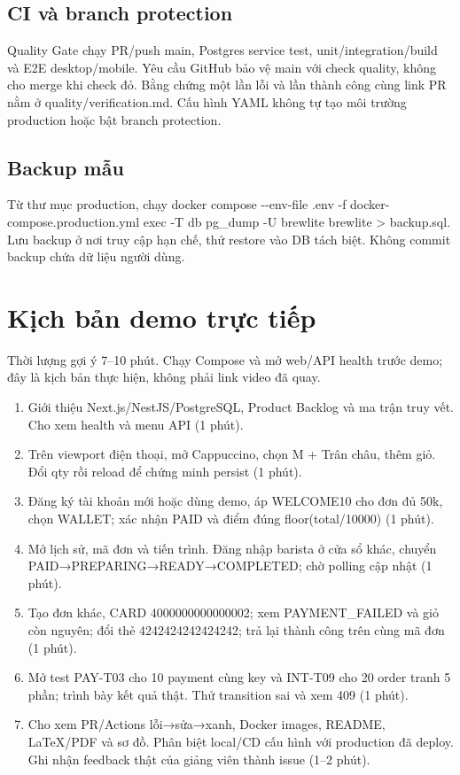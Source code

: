 \documentclass[a4paper,12pt,oneside]{report}
\begin{document}
\subsection{CI và branch protection}
Quality Gate chạy PR/\allowbreak{}push main, Postgres service test, unit/\allowbreak{}integration/\allowbreak{}build và E2E desktop/\allowbreak{}mobile. Yêu cầu GitHub bảo vệ main với check {\small\ttfamily quality}, không cho merge khi check đỏ. Bằng chứng một lần lỗi và lần thành công cùng link PR nằm ở quality/\allowbreak{}verification.md. Cấu hình YAML không tự tạo môi trường production hoặc bật branch protection.


\subsection{Backup mẫu}
Từ thư mục production, chạy {\small\ttfamily docker compose -\allowbreak{}-\allowbreak{}env-\allowbreak{}file .\allowbreak{}env -\allowbreak{}f docker-\allowbreak{}compose.\allowbreak{}production.\allowbreak{}yml exec -\allowbreak{}T db pg\_\allowbreak{}dump -\allowbreak{}U brewlite brewlite > backup.\allowbreak{}sql}. Lưu backup ở nơi truy cập hạn chế, thử restore vào DB tách biệt. Không commit backup chứa dữ liệu người dùng.


\section{Kịch bản demo trực tiếp}

Thời lượng gợi ý 7–10 phút. Chạy Compose và mở web/\allowbreak{}API health trước demo; đây là kịch bản thực hiện, không phải link video đã quay.


\begin{enumerate}
\item Giới thiệu Next.js/\allowbreak{}NestJS/\allowbreak{}PostgreSQL, Product Backlog và ma trận truy vết. Cho xem health và menu API (1 phút).
\item Trên viewport điện thoại, mở Cappuccino, chọn M + Trân châu, thêm giỏ. Đổi qty rồi reload để chứng minh persist (1 phút).
\item Đăng ký tài khoản mới hoặc dùng demo, áp WELCOME10 cho đơn đủ 50k, chọn WALLET; xác nhận PAID và điểm đúng floor(total/\allowbreak{}10000) (1 phút).
\item Mở lịch sử, mã đơn và tiến trình. Đăng nhập barista ở cửa sổ khác, chuyển PAID→PREPARING→READY→COMPLETED; chờ polling cập nhật (1 phút).
\item Tạo đơn khác, CARD 4000000000000002; xem PAYMENT\_FAILED và giỏ còn nguyên; đổi thẻ 4242424242424242; trả lại thành công trên cùng mã đơn (1 phút).
\item Mở test PAY-T03 cho 10 payment cùng key và INT-T09 cho 20 order tranh 5 phần; trình bày kết quả thật. Thử transition sai và xem 409 (1 phút).
\item Cho xem PR/\allowbreak{}Actions lỗi→sửa→xanh, Docker images, README, LaTeX/\allowbreak{}PDF và sơ đồ. Phân biệt local/\allowbreak{}CD cấu hình với production đã deploy. Ghi nhận feedback thật của giảng viên thành issue (1–2 phút).
\end{enumerate}
\end{document}
